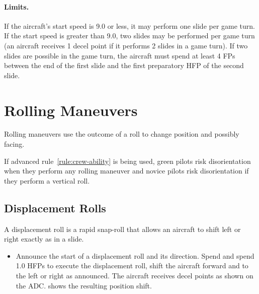 \paragraph{Limits.} If the aircraft's start speed is 9.0 or less, it may perform one slide per game turn. If the start speed is greater than 9.0, two slides may be performed per game turn (an aircraft receives 1 decel point if it performs 2 slides in a game turn). If two slides are possible in the game turn, the aircraft must spend at least 4 FPs between the end of the first slide and the first preparatory HFP of the second slide.

\section{Rolling Maneuvers}
\label{rule:rolling-maneuvers}

Rolling maneuvers use the outcome of a roll to change position and possibly facing.

If advanced rule~\ref{rule:crew-ability} is being used, green pilots risk disorientation when they perform any rolling maneuver and novice pilots risk disorientation if they perform a vertical roll.

\subsection{Displacement Rolls}

A displacement roll is a rapid snap-roll that allows an aircraft to shift left or right exactly as in a slide.

\begin{itemize}
    \item{} Announce the start of a displacement roll and its direction. Spend  and spend 1.0 HFPs to execute the displacement roll, shift the aircraft forward and to the left or right as announced.  The aircraft receives decel points as shown on the ADC.  shows the resulting position shift.

\end{itemize}

